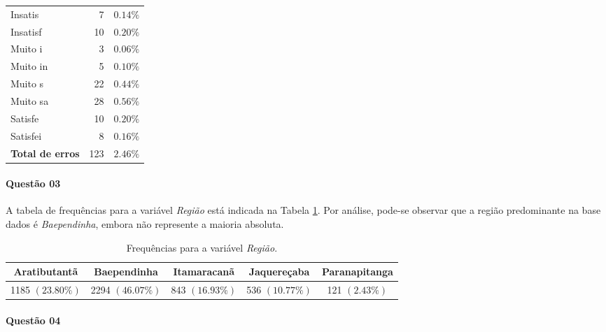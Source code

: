 \documentclass[10pt,a4paper,oneside]{article}
\newcommand{\arat}{Aratibutantã\xspace}
\newcommand{\baep}{Baependinha\xspace}
\newcommand{\itam}{Itamaracanã\xspace}
\newcommand{\jaqu}{Jaquereçaba\xspace}
\newcommand{\para}{Paranapitanga\xspace}
\begin{document}
\begin{table}[!h]
\begin{minipage}[t]{0.49\textwidth}
\begin{tabular}{l r r}
	Insatis    & 7   & $0.14\%$ \\
	Insatisf   & 10  & $0.20\%$ \\
	Muito i    & 3   & $0.06\%$ \\
	Muito in   & 5   & $0.10\%$ \\
	Muito s    & 22  & $0.44\%$ \\
	Muito sa   & 28  & $0.56\%$ \\
	Satisfe    & 10  & $0.20\%$ \\
	Satisfei   & 8   & $0.16\%$ \\	
	\midrule
	\textbf{Total de erros}  & 123  & $2.46\%$ \\	
	\bottomrule
\end{tabular}
\end{minipage}
\end{table}


\begin{table}[!h]
\centering

\end{table}

\FloatBarrier

\paragraph{Questão 03}

A tabela de frequências para a variável \textit{Região} está indicada na Tabela \ref{table: tabela frequencias regiao}. Por análise, pode-se observar que a região predominante na base dados é \textit{\baep}, embora não represente a maioria absoluta.

\begin{table}[!h]
\centering
\caption{Frequências para a variável \textit{Região}.}
\vspace{0.5em}
\label{table: tabela frequencias regiao}
\vspace{0.5em}
\begin{tabular}{c c c c c}
	\toprule
	\textbf{\arat}    & \textbf{\baep}   & \textbf{\itam}  & \textbf{\jaqu}  & \textbf{\para} \\
	\midrule
	1185 $(23.80\%)$  & 2294 $(46.07\%)$ & 843 $(16.93\%)$ & 536 $(10.77\%)$ & 121 $(2.43\%)$ \\
	\bottomrule
\end{tabular}
\end{table}

\paragraph{Questão 04}
\end{document}
